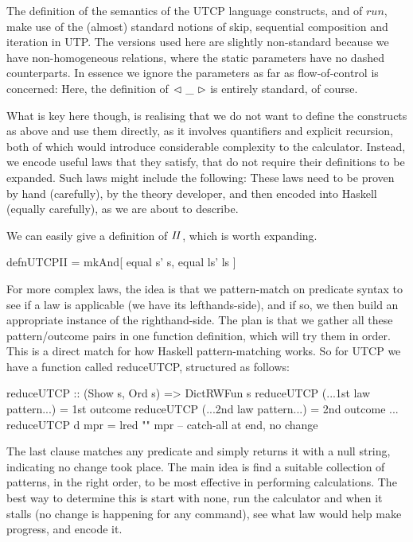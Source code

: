 The definition of the semantics of the UTCP language
constructs, and of $run$,
make use of the (almost) standard notions of skip,
sequential composition
and iteration in UTP.
The versions used here are slightly non-standard because we have
non-homogeneous relations,
where the static parameters have no dashed counterparts.
In essence we ignore the parameters as far as flow-of-control is concerned:
Here, the definition of $\mathrel{\lhd ~ {\_} ~ \rhd}$ is entirely standard, of course.

What is key here though,
is realising that we do not want to define the constructs
as above and use them directly, as it involves
quantifiers and explicit recursion,
both of which would introduce considerable complexity to the calculator.
Instead, we encode useful laws that they satisfy,
that do not require their definitions to be expanded.
Such laws might include the following:
These laws need to be proven by hand (carefully),
by the theory developer, and then encoded into Haskell
(equally carefully), as we are about to describe.

We can easily give a definition of $\mathit{II}$,
which is worth expanding.
\begin{code}
defnUTCPII = mkAnd[ equal s' s, equal ls' ls ]
\end{code}

For more complex laws,
the idea is that we pattern-match on predicate syntax
to see if a law is applicable (we have its lefthands-side),
and if so,
we then build an appropriate instance of the righthand-side.
The plan is that we gather all these pattern/outcome pairs
in one function definition,
which will try them in order.
This is a direct match for how Haskell pattern-matching works.
So for UTCP we have a function called reduceUTCP,
structured as follows:
\begin{code}
reduceUTCP :: (Show s, Ord s) => DictRWFun s
reduceUTCP (...1st law pattern...) = 1st outcome
reduceUTCP (...2nd law pattern...) = 2nd outcome
...
reduceUTCP d mpr = lred "" mpr -- catch-all at end, no change
\end{code}
The last clause matches any predicate
and simply returns it with a null string,
indicating no change took place.
The main idea is find a suitable collection of patterns,
in the right order,
to be most effective in performing calculations.
The best way to determine this is start with none,
run the calculator and when it stalls
(no change is happening for any command),
see what law would help make progress, and encode it.

